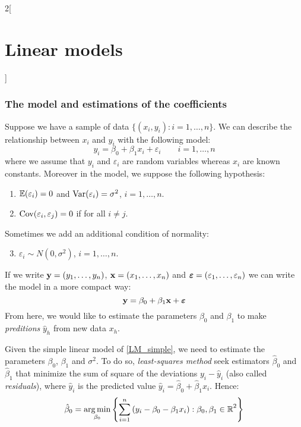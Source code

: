 \documentclass[../../../main_math.tex]{subfiles}
\begin{document}
\begin{multicols}{2}[\section{Linear models}]
  \subsubsection{The model and estimations of the coefficients}
  \begin{definition}
    Suppose we have a sample of data $\{(x_i,y_i):i=1,\ldots,n\}$. We can describe the relationship between $x_i$ and $y_i$ with the following model:
    $$y_i=\beta_0+\beta_1x_i+\varepsilon_i\qquad i=1,\ldots,n$$
    where we assume that $y_i$ and $\varepsilon_i$ are random variables whereas $x_i$ are known constants. Moreover in the model, we suppose the following hypothesis:
    \begin{enumerate}
      \item $\mathbb{E}(\varepsilon_i)=0$ and $\mathrm{Var}(\varepsilon_i)=\sigma^2$, $i=1,\ldots,n$.
      \item $\mathrm{Cov}(\varepsilon_i,\varepsilon_j)=0$ if for all $i\ne j$.
    \end{enumerate}
    Sometimes we add an additional condition of normality:
    \begin{enumerate}\setcounter{enumii}{2}
      \item $\varepsilon_i\sim N(0,\sigma^2)$, $i=1,\ldots,n$.
    \end{enumerate}
    If we write $\boldsymbol{\mathrm{y}}=(y_1,\ldots,y_n)$, $\boldsymbol{\mathrm{x}}=(x_1,\ldots,x_n)$ and $\boldsymbol{\mathrm{\varepsilon}}=(\varepsilon_1,\ldots,\varepsilon_n)$ we can write the model in a more compact way:
    \begin{equation}\label{LM_simple}
      \boldsymbol{\mathrm{y}}=\beta_0+\beta_1\boldsymbol{\mathrm{x}}+\boldsymbol{\mathrm{\varepsilon}}
    \end{equation}
    From here, we would like to estimate the parameters $\beta_0$ and $\beta_1$ to make \emph{preditions} $\hat{y}_h$ from new data $x_h$.
  \end{definition}
  \begin{proposition}
    Given the simple linear model of \cref{LM_simple}, we need to estimate the parameters $\beta_0$, $\beta_1$ and $\sigma^2$. To do so, \emph{least-squares method} seek estimators $\hat\beta_0$ and $\hat\beta_1$ that minimize the sum of square of the deviations $y_i-\hat{y}_i$ (also called \emph{residuals}), where $\hat{y}_i$ is the predicted value $\hat{y}_i=\hat\beta_0+\hat\beta_1 x_i$. Hence:
    \begin{align*}
      \hat\beta_0 & =\argmin_{\beta_0}\left\{\sum_{i=1}^n{(y_i-\beta_0-\beta_1x_i):\beta_0,\beta_1\in\RR}^2\right\} \\

\end{align*}
\end{proposition}
\end{multicols}
\end{document}
